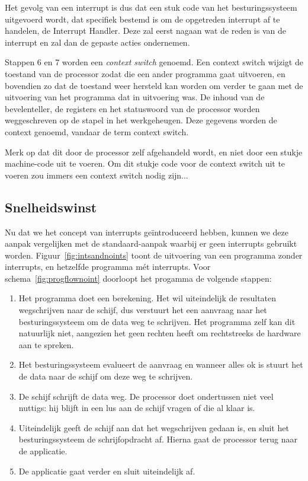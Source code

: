 Het gevolg van een interrupt is dus dat een stuk code van het
besturingssysteem uitgevoerd wordt, dat specifiek bestemd is om de
opgetreden interrupt af te handelen, de Interrupt Handler. Deze zal
eerst nagaan wat de reden is van de interrupt en zal dan de gepaste
acties ondernemen.

Stappen 6 en 7 worden een \emph{context switch}
genoemd. Een context switch wijzigt de toestand van de processor zodat
die een ander programma gaat uitvoeren, en bovendien zo dat de
toestand weer hersteld kan worden om verder te gaan met de uitvoering
van het programma dat in uitvoering was. De inhoud van de
bevelenteller, de registers en het statuswoord van de processor worden
weggeschreven op de stapel in het werkgeheugen. Deze gegevens worden
de context genoemd, vandaar de term context switch.

Merk op dat dit door de processor zelf afgehandeld wordt, en
niet door een stukje machine-code uit te voeren. Om dit stukje code
voor de context switch uit te voeren zou immers een context switch
nodig zijn...

\subsection{Snelheidswinst}

Nu dat we het concept van interrupts ge\"introduceerd hebben, kunnen we deze aanpak vergelijken met de standaard-aanpak waarbij er geen interrupts gebruikt worden. Figuur~\ref{fig:intsandnoints} toont de uitvoering van een programma zonder interrupts, en hetzelfde programma m\'et interrupts. Voor schema~\ref{fig:progflownoint} doorloopt het progamma de volgende stappen:

\begin{enumerate}
\item Het programma doet een berekening. Het wil uiteindelijk de resultaten wegschrijven naar de schijf, dus verstuurt het een aanvraag naar het besturingssysteem om de data weg te schrijven. Het programma zelf kan dit natuurlijk niet, aangezien het geen rechten heeft om rechtstreeks de hardware aan te spreken.
\item Het besturingssysteem evalueert de aanvraag en wanneer alles ok is stuurt het de data naar de schijf om deze weg te schrijven.
\item De schijf schrijft de data weg. De processor doet ondertussen niet veel nuttigs: hij blijft in een lus aan de schijf vragen of die al klaar is.
\item Uiteindelijk geeft de schijf aan dat het wegschrijven gedaan is, en sluit het besturingssysteem de schrijfopdracht af. Hierna gaat de processor terug naar de applicatie.
\item De applicatie gaat verder en sluit uiteindelijk af.
\end{enumerate}

